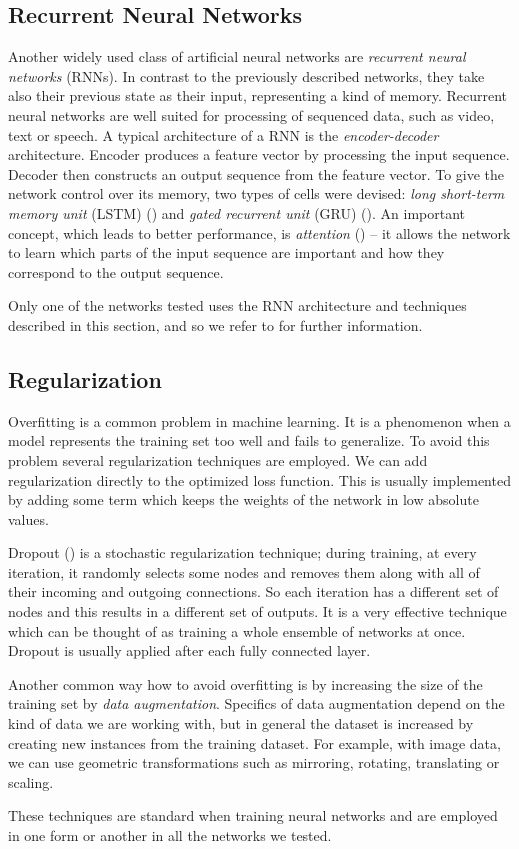 \subsection{Recurrent Neural Networks}
\label{sec:rnns}
Another widely used class of artificial neural networks are \textit{recurrent neural networks} (RNNs). In contrast to the previously described networks, they take  also their previous state as their input, representing a kind of memory. Recurrent neural networks are well suited for processing of sequenced data, such as video, text or speech. A typical architecture of a RNN is the \textit{encoder-decoder} architecture. Encoder produces a feature vector by processing the input sequence. Decoder then constructs an output sequence from the feature vector. To give the network control over its memory, two types of cells were devised: \textit{long short-term memory unit} (LSTM) (\cite{hochreiter_long_1997}) and \textit{gated recurrent unit} (GRU) (\cite{cho_learning_2014}). An important concept, which leads to better performance, is \textit{attention} (\cite{bahdanau_neural_2014}) -- it allows the network to learn which parts of the input sequence are important and how they correspond to the output sequence.\par
Only one of the networks tested uses the RNN architecture and techniques described in this section, and  so we refer to \cite{goodfellow_deep_2016} for further information. 

\subsection{Regularization}
\label{sec:regularization}
Overfitting is a common problem in machine learning. It is a phenomenon when a model represents the training set too well and fails to generalize. To avoid this problem several regularization techniques are employed. We can add regularization directly to the optimized loss function. This is usually implemented by adding some term which keeps the weights of the network in low absolute values. \par
Dropout (\cite{srivastava_dropout:_2014}) is a stochastic regularization technique; during training, at every iteration, it randomly selects some nodes and removes them along with all of their incoming and outgoing connections. So each iteration has a different set of nodes and this results in a different set of outputs. It is a very effective technique which can be thought of as training a whole ensemble of networks at once. Dropout is usually applied after each fully connected layer. \par
Another common way how to avoid overfitting is by increasing the size of the training set by \textit{data augmentation}. Specifics of data augmentation depend on the kind of data we are working with, but in general the dataset is increased by creating new instances from the training dataset. For example, with image data, we can use geometric transformations such as mirroring, rotating, translating or scaling. \par
These techniques are standard when training neural networks and are employed in one form or another in all the networks we tested.

